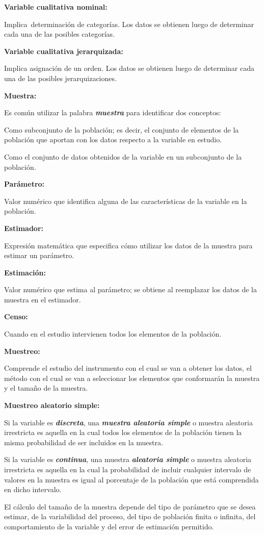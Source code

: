 \documentclass[a5paper,doc,10pt,noapacite]{apa6}
\newcommand{\neodefi}[1]{%
	\vspace{1\baselineskip}
	\textbf{\small#1} \newline
}
\begin{document}
{{\neodefi{Variable cualitativa nominal:}
	Implica determinación de categorías. Los datos se obtienen luego de determinar cada una de las posibles categorías.
 
\neodefi{Variable cualitativa jerarquizada:}
	Implica asignación de un orden. Los datos se obtienen luego de determinar cada una de las posibles jerarquizaciones.

\neodefi{Muestra:}
	Es común utilizar la palabra \emph{\textbf{muestra}} para identificar dos conceptos:
	\begin{seriate}
		\item	Como subconjunto de la población; es decir, el conjunto de elementos de la población que aportan con los datos respecto a la variable en estudio.
		\item	Como el conjunto de datos obtenidos de la variable en un subconjunto de la población.
	\end{seriate}
	
\neodefi{Parámetro:}
	Valor numérico que identifica alguna de las características de la variable en la población. 
	
\neodefi{Estimador:}
	Expresión matemática que especifica cómo utilizar los datos de la muestra para estimar un parámetro. 
	
\neodefi{Estimación:}
	Valor numérico que estima al parámetro; se obtiene al reemplazar los datos de la muestra en el estimador. 
	
\neodefi{Censo:}
	Cuando en el estudio intervienen todos los elementos de la población.
	
\neodefi{Muestreo:}
	Comprende el estudio del instrumento con el cual se van a obtener los datos, el método con el cual se van a seleccionar los elementos que conformarán la muestra y el tamaño de la muestra. 
	
\neodefi{Muestreo aleatorio simple:}
	Si la variable es \emph{\textbf{discreta}}, una \emph{\textbf{muestra aleatoria simple}} o muestra aleatoria irrestricta es aquella en la cual todos los elementos de la población tienen la misma probabilidad de ser incluidos en la muestra.
	
	Si la variable es \emph{\textbf{continua}}, una muestra \emph{\textbf{aleatoria simple}} o muestra aleatoria irrestricta es aquella en la cual la probabilidad de incluir cualquier intervalo de valores en la muestra es igual al porcentaje de la población que está comprendida en dicho intervalo.
	
	El cálculo del tamaño de la muestra depende del tipo de parámetro que se desea estimar, de la variabilidad del proceso, del tipo de población finita o infinita, del comportamiento de la variable y del error de estimación permitido.
	
}}
\end{document}
